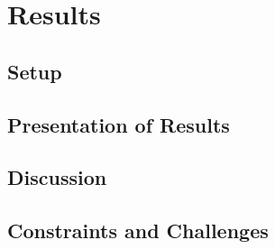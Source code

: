 \section{Results}

\subsection{Setup}
\subsection{Presentation of Results}
\subsection{Discussion}
\subsection{Constraints and Challenges}